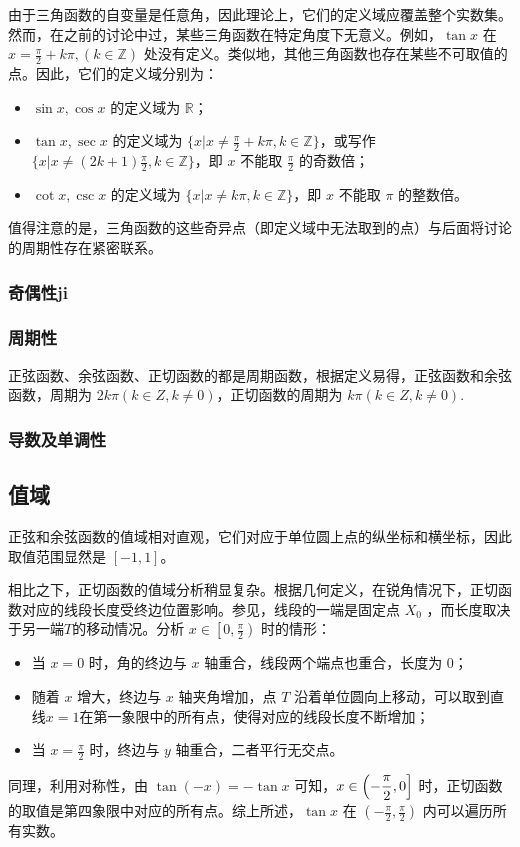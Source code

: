 由于三角函数的自变量是任意角，因此理论上，它们的定义域应覆盖整个实数集。然而，在之前的讨论中过，某些三角函数在特定角度下无意义。例如，$\tan x$ 在 $\displaystyle x=\frac{\pi}{2}+k\pi, (k\in\mathbb{Z})$ 处没有定义。类似地，其他三角函数也存在某些不可取值的点。因此，它们的定义域分别为：
\begin{itemize}
\item $\sin x,\cos x$ 的定义域为 $\mathbb{R}$；
\item $\tan x,\sec x$ 的定义域为 $\displaystyle\{x|x\neq\frac{\pi}{2}+k\pi,k\in\mathbb{Z}\}$，或写作$\displaystyle\{x|x\neq(2k+1)\frac{\pi}{2},k\in\mathbb{Z}\}$，即 $x$ 不能取 $\frac{\pi}{2}$ 的奇数倍；
\item $\cot x,\csc x$ 的定义域为 $\displaystyle\{x|x\neq k\pi,k\in\mathbb{Z}\}$，即 $x$ 不能取 $\pi$ 的整数倍。
\end{itemize}
值得注意的是，三角函数的这些奇异点（即定义域中无法取到的点）与后面将讨论的周期性存在紧密联系。

\subsubsection{奇偶性ji}

\subsubsection{周期性}
正弦函数、余弦函数、正切函数的都是周期函数，根据定义易得，正弦函数和余弦函数，周期为 $2k\pi(k\in Z,k\neq0)$，正切函数的周期为 $k\pi(k\in Z,k\neq0)$.

\subsubsection{导数及单调性}

\subsection{值域}

正弦和余弦函数的值域相对直观，它们对应于单位圆上点的纵坐标和横坐标，因此取值范围显然是 $[-1,1]$。

相比之下，正切函数的值域分析稍显复杂。根据几何定义，在锐角情况下，正切函数对应的线段长度受终边位置影响。参见，线段的一端是固定点 $X_0$ ，而长度取决于另一端$T$的移动情况。分析 $\displaystyle x\in\left[0,\frac{\pi}{2}\right)$ 时的情形：
\begin{itemize}
\item 当 $x=0$ 时，角的终边与 $x$ 轴重合，线段两个端点也重合，长度为 $0$；
\item 随着 $x$ 增大，终边与 $x$ 轴夹角增加，点 $T$ 沿着单位圆向上移动，可以取到直线$x=1$在第一象限中的所有点，使得对应的线段长度不断增加；
\item 当 $x=\frac{\pi}{2}$ 时，终边与 $y$ 轴重合，二者平行无交点。
\end{itemize}
同理，利用对称性，由 $\tan(-x) = -\tan x$ 可知，$\displaystyle x\in\left(-{\pi\over2},0\right]$ 时，正切函数的取值是第四象限中对应的所有点。综上所述，$\tan x$ 在 $\displaystyle \left(-\frac{\pi}{2},\frac{\pi}{2}\right)$ 内可以遍历所有实数。

